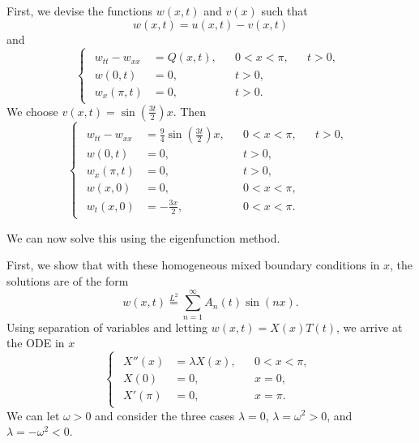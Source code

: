 \documentclass[plain]{pset}
\begin{document}
\begin{solution}
    First, we devise the functions \(w(x, t)\) and \(v(x)\) such that
    \[w(x, t) = u(x, t) - v(x, t)\]
    and
    \[
        \begin{cases}
            \begin{aligned}
                w_{tt} - w_{xx} & = Q(x, t), &  & 0 < x < \pi, &  & t > 0, \\
                w(0, t)         & = 0,       &  & t > 0,                   \\
                w_x(\pi, t)     & = 0,       &  & t > 0.
            \end{aligned}
        \end{cases}
    \]
    We choose \(v(x, t) = \sin\left(\frac{3t}{2}\right)x\). Then
    \[
        \begin{cases}
            \begin{aligned}
                w_{tt} - w_{xx} & = \frac{9}{4}\sin\left(\frac{3t}{2}\right)x, &  & 0 < x < \pi, &  & t > 0, \\
                w(0, t)         & = 0,                                         &  & t > 0,                   \\
                w_x(\pi, t)     & = 0,                                         &  & t > 0,                   \\
                w(x, 0)         & = 0,                                         &  & 0 < x < \pi,             \\
                w_t(x, 0)       & = -\frac{3x}{2},                             &  & 0 < x < \pi.
            \end{aligned}
        \end{cases}
    \]

    We can now solve this using the eigenfunction method.

    First, we show that with these homogeneous mixed boundary conditions in \(x\), the solutions are of the form
    \[w(x, t) \stackrel{L^2}{=} \sum_{n = 1}^\infty A_n(t) \sin(nx).\]
    Using separation of variables and letting \(w(x, t) = X(x)T(t)\), we arrive at the ODE in \(x\)
    \[
        \begin{cases}
            \begin{aligned}
                X''(x)  & = \lambda X(x), &  & 0 < x < \pi, \\
                X(0)    & = 0,            &  & x = 0,       \\
                X'(\pi) & = 0,            &  & x = \pi.
            \end{aligned}
        \end{cases}
    \]
    We can let \(\omega > 0\) and consider the three cases \(\lambda = 0\), \(\lambda = \omega^2 > 0\), and \(\lambda = -\omega^2 < 0\).


\end{solution}
\end{document}
